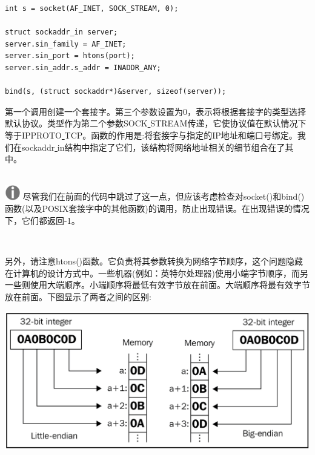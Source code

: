 \begin{lstlisting}[caption={}]
int s = socket(AF_INET, SOCK_STREAM, 0);

struct sockaddr_in server;
server.sin_family = AF_INET;
server.sin_port = htons(port);
server.sin_addr.s_addr = INADDR_ANY;

bind(s, (struct sockaddr*)&server, sizeof(server));
\end{lstlisting}

第一个调用创建一个套接字。第三个参数设置为0，表示将根据套接字的类型选择默认协议。类型作为第二个参数SOCK\underline{ }STREAM传递，它使协议值在默认情况下等于IPPROTO\underline{ }TCP。函数的作用是:将套接字与指定的IP地址和端口号绑定。我们在sockaddr\underline{ }in结构中指定了它们，该结构将网络地址相关的细节组合在了其中。 \par

\hspace*{\fill} \\ %
\includegraphics[width=0.05\textwidth]{images/warn}
尽管我们在前面的代码中跳过了这一点，但应该考虑检查对socket()和bind()函数(以及POSIX套接字中的其他函数)的调用，防止出现错误。在出现错误的情况下，它们都返回-1。 \par
\noindent\textbf{}\ \par

另外，请注意htons()函数。它负责将其参数转换为网络字节顺序，这个问题隐藏在计算机的设计方式中。一些机器(例如：英特尔处理器)使用小端字节顺序，而另一些则使用大端顺序。小端顺序将最低有效字节放在前面。大端顺序将最有效字节放在前面。下图显示了两者之间的区别: \par

\begin{center}
	\includegraphics[width=1.0\textwidth]{content/Section-2/Chapter-12/11}
\end{center}

